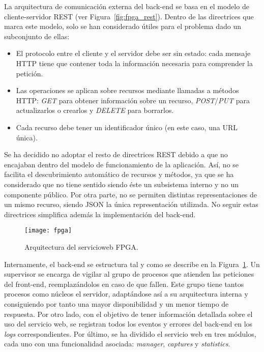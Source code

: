 La arquitectura de comunicación externa del \gls{back-end} se basa en el modelo de cliente-servidor \gls{REST} (ver Figura~\ref{fig:fpga_rest}).
Dentro de las directrices que marca este modelo, solo se han considerado útiles para el problema dado un subconjunto de ellas:
\begin{itemize}
  \item El protocolo entre el cliente y el servidor debe ser sin estado: cada mensaje \gls{HTTP} tiene que contener toda la información necesaria para comprender la petición.
  \item Las operaciones se aplican sobre recursos mediante llamadas a métodos \gls{HTTP}: \textit{GET} para obtener información sobre un recurso, \textit{POST}/\textit{PUT} para actualizarlos o crearlos y \textit{DELETE} para borrarlos.
  \item Cada recurso debe tener un identificador único (en este caso, una \gls{URL} única).
\end{itemize}

Se ha decidido no adoptar el resto de directrices \gls{REST} debido a que no encajaban dentro del modelo de funcionamiento de la aplicación.
Así, no se facilita el descubrimiento automático de recursos y métodos, ya que se ha considerado que no tiene sentido siendo éste un subsistema interno y no un componente público.
Por otra parte, no se permiten distintas representaciones de un mismo recurso, siendo \gls{JSON} la única representación utilizada.
No seguir estas directrices simplifica además la implementación del \gls{back-end}.

\begin{figure}[!htp]
  \centering
  \texttt{[image: fpga]}
  \caption{Arquitectura del \gls{servicioweb} \gls{FPGA}.}
  \label{fig:arquitectura_servicio}
\end{figure}

Internamente, el \gls{back-end} se estructura tal y como se describe en la Figura~\ref{fig:arquitectura_servicio}.
Un supervisor se encarga de vigilar al grupo de procesos que atienden las peticiones del \gls{front-end}, reemplazándolos en caso de que fallen.
Este grupo tiene tantos procesos como núcleos el servidor, adaptándose así a su arquitectura interna y consiguiendo por tanto una mayor disponibilidad y un menor tiempo de respuesta.
Por otro lado, con el objetivo de tener información detallada sobre el uso del servicio web, se registran todos los eventos y errores del \gls{back-end} en los \textit{logs} correspondientes.
Por último, se ha dividido el servicio web en tres módulos, cada uno con una funcionalidad asociada: \textit{manager}, \textit{captures} y \textit{statistics}.

